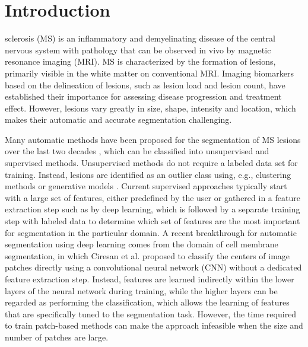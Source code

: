 \section{Introduction}

sclerosis (MS) is an inflammatory and demyelinating disease of the central
nervous system with pathology that can be observed in vivo by magnetic resonance
imaging (MRI). MS is characterized by the formation of lesions, primarily
visible in the white matter on conventional MRI. Imaging biomarkers based on the
delineation of lesions, such as lesion load and lesion count, have established
their importance for assessing disease progression and treatment effect.
However, lesions vary greatly in size, shape, intensity and location, which
makes their automatic and accurate segmentation challenging.




Many automatic methods have been proposed for the segmentation of MS
\mbox{lesions} over the last two decades \cite{garcia2013review}, which can be
classified into unsupervised and supervised methods. Unsupervised methods do not
require a labeled data set for training. Instead, lesions are identified as an
outlier class using, e.g., clustering methods \cite{souplet2008} or generative
models \cite{weiss2013}. Current supervised approaches typically start with a
large set of features, either predefined by the user \cite{geremia2010} or gathered in a feature extraction
step such as by deep learning\cite{yoo2014}, which is followed by a separate
training step with labeled data to determine which set of features are the most
important for segmentation in the particular domain.
A recent breakthrough for automatic segmentation using deep learning comes from
the domain of cell membrane segmentation, in which Ciresan et al.
\cite{Ciresan2012} proposed to classify the centers of image patches directly
using a convolutional neural network (CNN) \cite{LeCun1998} without a dedicated
feature extraction step. Instead, features are learned indirectly within the
lower layers of the neural network during training, while the higher layers can
be regarded as performing the classification, which allows the learning of
features that are specifically tuned to the segmentation task. However, the time
required to train patch-based methods can make the approach infeasible when the
size and number of patches are large.

